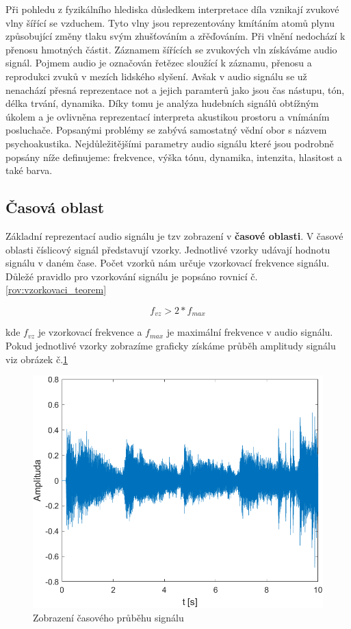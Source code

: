  Při pohledu z fyzikálního hlediska důsledkem interpretace díla vznikají zvukové vlny šířící se vzduchem.
  Tyto vlny jsou reprezentovány kmítáním atomů plynu způsobující změny tlaku svým zhušťováním a zřěďováním. Při vlnění nedochází k přenosu hmotných částit.
  Záznamem šířících se zvukových vln získáváme audio signál.
  Pojmem audio je označován řetězec sloužící k záznamu, přenosu a reprodukci zvuků v mezích lidského slyšení. 
  Avšak v audio signálu se už nenachází přesná reprezentace not a jejich paramterů jako jsou čas nástupu, tón, délka trvání, dynamika.
  Díky tomu je analýza hudebních signálů obtížným úkolem a je ovlivněna reprezentací interpreta akustikou prostoru a vnímáním posluchače.
  Popsanými problémy se zabývá samostatný vědní obor s názvem psychoakustika.
  Nejdůležitějšími parametry audio signálu které jsou podrobně popsány níže definujeme: frekvence, výška tónu, dynamika, intenzita, hlasitost a také barva.


  \subsection{Časová oblast}
  Základní reprezentací audio signálu je tzv zobrazení v \textbf{časové oblasti}.
  V časové oblasti číslicový signál představují vzorky. Jednotlivé vzorky udávají hodnotu signálu v daném čase.
  Počet vzorků nám určuje vzorkovací frekvence signálu. Důležé pravidlo pro vzorkování signálu je popsáno rovnicí č. \ref*{rov:vzorkovaci_teorem}
  
  \begin{equation}
    f_{vz} > 2 * f_{max}
    \label{rov:vzorkovaci_teorem}
  \end{equation}

  kde $f_{vz}$ je vzorkovací frekvence a $f_{max}$ je maximální frekvence v audio signálu.  
  Pokud jednotlivé vzorky zobrazíme graficky získáme průběh amplitudy signálu viz obrázek č.\ref*{fig:Waveform}

  \begin{figure}[H]
    \centering
    \includegraphics[width = 0.8\linewidth]{obrazky/Waveform.png}
    \caption{Zobrazení časového průběhu signálu}
    \label{fig:Waveform}
  \end{figure}

